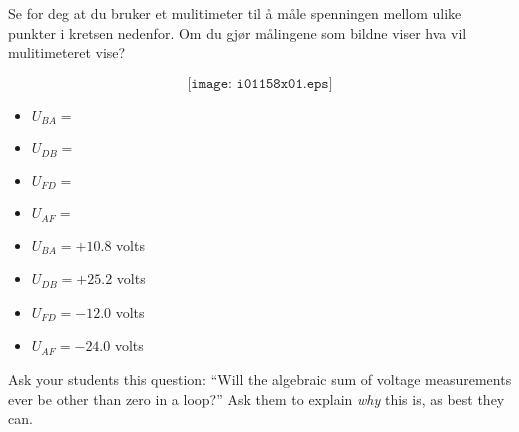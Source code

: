 

Se for deg at du bruker et mulitimeter til å måle spenningen mellom ulike punkter i kretsen nedenfor. Om du gjør målingene som bildne viser hva vil mulitimeteret vise?

$$\texttt{[image: i01158x01.eps]}$$


\begin{itemize}
\item{} $U_{BA} = $
\item{} $U_{DB} = $
\item{} $U_{FD} = $
\item{} $U_{AF} = $
\end{itemize}








\begin{itemize}
\item{} $U_{BA} = +10.8$ volts
\item{} $U_{DB} = +25.2$ volts
\item{} $U_{FD} = -12.0$ volts
\item{} $U_{AF} = -24.0$ volts
\end{itemize}







Ask your students this question: ``Will the algebraic sum of voltage measurements ever be other than zero in a loop?''  Ask them to explain {\it why} this is, as best they can.




